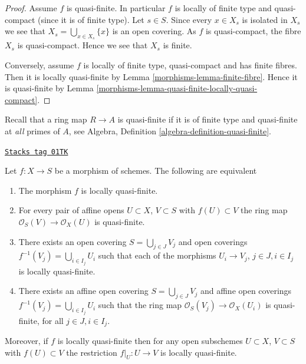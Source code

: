 \begin{proof}

Assume $f$ is quasi-finite. In particular $f$ is locally of finite type
and quasi-compact (since it is of finite type). Let $s \in S$. Since
every $x \in X_s$ is isolated in $X_s$ we see that
$X_s = \bigcup_{x \in X_s} \{x\}$ is an open covering. As $f$
is quasi-compact, the fibre $X_s$ is quasi-compact. Hence we see
that $X_s$ is finite.

\medskip\noindent
Conversely, assume $f$ is locally of finite type, quasi-compact
and has finite fibres. Then it is locally quasi-finite by
Lemma \ref{morphisms-lemma-finite-fibre}. Hence it is quasi-finite by
Lemma \ref{morphisms-lemma-quasi-finite-locally-quasi-compact}.
\end{proof}

Recall that a ring map $R \to A$ is quasi-finite if it is
of finite type and quasi-finite at {\it all} primes of $A$, see
Algebra, Definition \ref{algebra-definition-quasi-finite}.

\begin{lemma}
\label{morphisms-lemma-locally-quasi-finite-characterize}
\href{https://stacks.math.columbia.edu/tag/01TK}{\texttt{Stacks tag 01TK}}

Let $f : X \to S$ be a morphism of schemes.
The following are equivalent
\begin{enumerate}
\item The morphism $f$ is locally quasi-finite.
\item For every pair of affine opens $U \subset X$, $V \subset S$
with $f(U) \subset V$ the ring map
$\mathcal{O}_S(V) \to \mathcal{O}_X(U)$ is quasi-finite.
\item There exists an open covering $S = \bigcup_{j \in J} V_j$
and open coverings $f^{-1}(V_j) = \bigcup_{i \in I_j} U_i$ such
that each of the morphisms $U_i \to V_j$, $j\in J, i\in I_j$
is locally quasi-finite.
\item There exists an affine open covering $S = \bigcup_{j \in J} V_j$
and affine open coverings $f^{-1}(V_j) = \bigcup_{i \in I_j} U_i$ such
that the ring map $\mathcal{O}_S(V_j) \to \mathcal{O}_X(U_i)$ is
quasi-finite, for all $j\in J, i\in I_j$.
\end{enumerate}
Moreover, if $f$ is locally quasi-finite then for
any open subschemes $U \subset X$, $V \subset S$ with $f(U) \subset V$
the restriction $f|_U : U \to V$ is locally quasi-finite.
\end{lemma}

